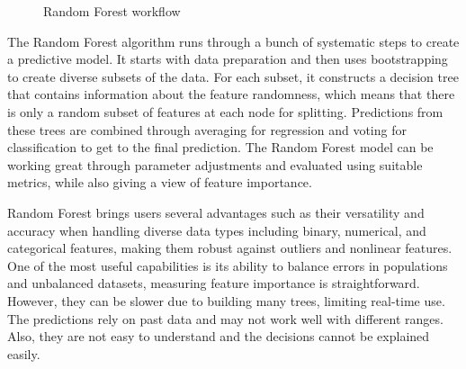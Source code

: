 \begin{figure}[h]
\centering
\caption{Random Forest workflow} \label{fig:rand_forrest_workflow}
\end{figure}

The Random Forest algorithm runs through a bunch of systematic steps to create a predictive model. It starts with data preparation and then uses bootstrapping to create diverse subsets of the data. For each subset, it constructs a decision tree that contains information about the feature randomness, which means that there is only a random subset of features at each node for splitting. Predictions from these trees are combined through averaging for regression and voting for classification to get to the final prediction. The Random Forest model can be working great through parameter adjustments and evaluated using suitable metrics, while also giving a view of feature importance. 

Random Forest brings users several advantages such as their versatility and accuracy when handling diverse data types including binary, numerical, and categorical features, making them robust against outliers and nonlinear features. One of the most useful capabilities is its ability to balance errors in populations and unbalanced datasets, measuring feature importance is straightforward. However, they can be slower due to building many trees, limiting real-time use. The predictions rely on past data and may not work well with different ranges. Also, they are not easy to understand and the decisions cannot be explained easily.

